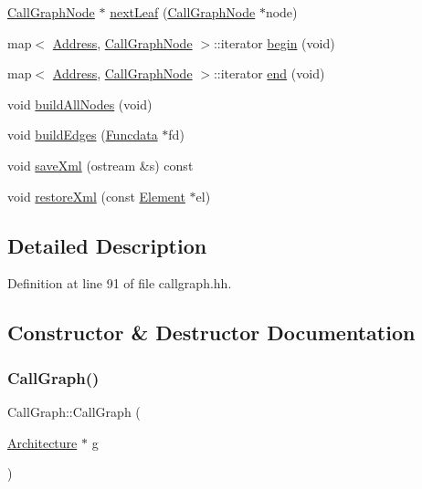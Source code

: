 \begin{DoxyCompactItemize}
\item 
\mbox{\hyperlink{class_call_graph_node}{Call\+Graph\+Node}} $\ast$ \mbox{\hyperlink{class_call_graph_a466944999f6f0f2b68cbfc90043ecc6c}{next\+Leaf}} (\mbox{\hyperlink{class_call_graph_node}{Call\+Graph\+Node}} $\ast$node)
\item 
map$<$ \mbox{\hyperlink{class_address}{Address}}, \mbox{\hyperlink{class_call_graph_node}{Call\+Graph\+Node}} $>$\+::iterator \mbox{\hyperlink{class_call_graph_a0726755cab08bdb512eb183b088bc32b}{begin}} (void)
\item 
map$<$ \mbox{\hyperlink{class_address}{Address}}, \mbox{\hyperlink{class_call_graph_node}{Call\+Graph\+Node}} $>$\+::iterator \mbox{\hyperlink{class_call_graph_ad363d6774131c216fcb865ad114aadd9}{end}} (void)
\item 
void \mbox{\hyperlink{class_call_graph_ad551fc740c138722552a84e314a37d84}{build\+All\+Nodes}} (void)
\item 
void \mbox{\hyperlink{class_call_graph_a3cc813013efc9165d2f0496c9de488e4}{build\+Edges}} (\mbox{\hyperlink{class_funcdata}{Funcdata}} $\ast$fd)
\item 
void \mbox{\hyperlink{class_call_graph_a4b5c78fa8c1942020bac287c81f8f56d}{save\+Xml}} (ostream \&s) const
\item 
void \mbox{\hyperlink{class_call_graph_ac92fb04f41917974663c5e92d46e51a5}{restore\+Xml}} (const \mbox{\hyperlink{class_element}{Element}} $\ast$el)
\end{DoxyCompactItemize}


\subsection{Detailed Description}


Definition at line 91 of file callgraph.\+hh.



\subsection{Constructor \& Destructor Documentation}
\mbox{\label{class_call_graph_a4e571ae9abe012afa6265dd7b95835cb}} 
\subsubsection{\texorpdfstring{CallGraph()}{CallGraph()}}
{\footnotesize\ttfamily Call\+Graph\+::\+Call\+Graph (\begin{DoxyParamCaption}\item[{\mbox{\hyperlink{class_architecture}{Architecture}} $\ast$}]{g }\end{DoxyParamCaption})\hspace{0.3cm}{\ttfamily [inline]}}



